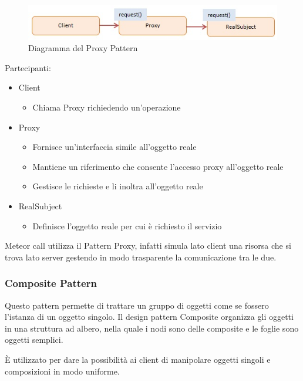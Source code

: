 	\FloatBarrier
	\begin{figure}[ht]
		\centering
		\includegraphics[scale=0.45]{img/javascript-proxy.jpg}
		\caption{Diagramma del Proxy Pattern}
	\end{figure}
	
	Partecipanti:
	\begin{itemize}
		\item Client
			\begin{itemize}
				\item Chiama Proxy richiedendo un'operazione
			\end{itemize}
		\item Proxy
			\begin{itemize}
				\item Fornisce un'interfaccia simile all'oggetto reale
				\item Mantiene un riferimento che consente l'accesso proxy all'oggetto reale
				\item Gestisce le richieste e li inoltra all'oggetto reale
			\end{itemize}
		\item RealSubject
			\begin{itemize}
				\item Definisce l'oggetto reale per cui è richiesto il servizio
			\end{itemize}
	\end{itemize}

Meteor call utilizza il Pattern Proxy, infatti simula lato client una risorsa che si trova lato server gestendo in modo trasparente la comunicazione tra le due.

\subsubsection{Composite Pattern}
Questo pattern permette di trattare un gruppo di oggetti come se fossero l'istanza di un oggetto singolo. Il design pattern Composite organizza gli oggetti in una struttura ad albero, nella quale i nodi sono delle composite e le foglie sono oggetti semplici.

È utilizzato per dare la possibilità ai client di manipolare oggetti singoli e composizioni in modo uniforme.

